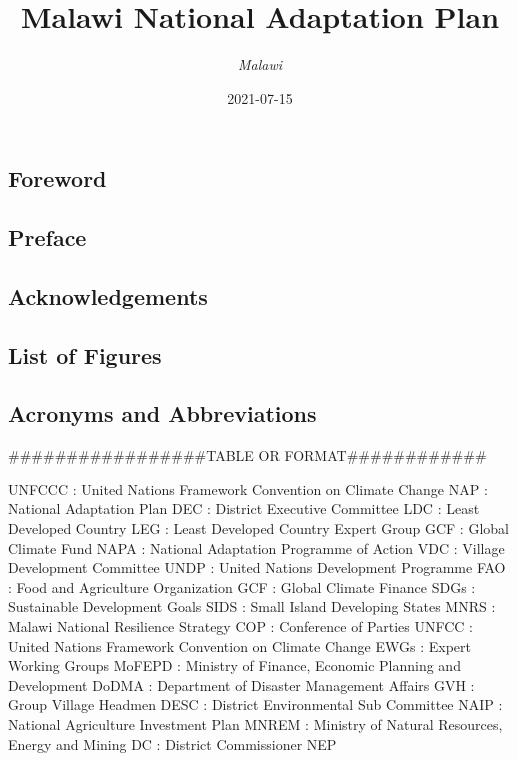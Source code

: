\documentclass[
]{book}
\title{Malawi National Adaptation Plan}
\author{\emph{Malawi}}
\date{2021-07-15}
\begin{document}
\maketitle

{
\setcounter{tocdepth}{1}
\tableofcontents
}
\hypertarget{section}{%
\chapter{}\label{section}}

\hypertarget{foreword}{%
\section{Foreword}\label{foreword}}

\hypertarget{preface}{%
\section{Preface}\label{preface}}

\hypertarget{acknowledgements}{%
\section{Acknowledgements}\label{acknowledgements}}

\hypertarget{list-of-figures}{%
\section{List of Figures}\label{list-of-figures}}

\hypertarget{acronyms-and-abbreviations}{%
\section{Acronyms and Abbreviations}\label{acronyms-and-abbreviations}}

\#\#\#\#\#\#\#\#\#\#\#\#\#\#\#\#\#TABLE OR FORMAT\#\#\#\#\#\#\#\#\#\#\#\#

UNFCCC : United Nations Framework Convention on Climate Change
NAP : National Adaptation Plan
DEC : District Executive Committee
LDC : Least Developed Country
LEG : Least Developed Country Expert Group
GCF : Global Climate Fund
NAPA : National Adaptation Programme of Action
VDC : Village Development Committee
UNDP : United Nations Development Programme
FAO : Food and Agriculture Organization
GCF : Global Climate Finance
SDGs : Sustainable Development Goals
SIDS : Small Island Developing States
MNRS : Malawi National Resilience Strategy
COP : Conference of Parties
UNFCC : United Nations Framework Convention on Climate Change
EWGs : Expert Working Groups
MoFEPD : Ministry of Finance, Economic Planning and Development
DoDMA : Department of Disaster Management Affairs
GVH : Group Village Headmen
DESC : District Environmental Sub Committee
NAIP : National Agriculture Investment Plan
MNREM : Ministry of Natural Resources, Energy and Mining
DC : District Commissioner
NEP
\end{document}
